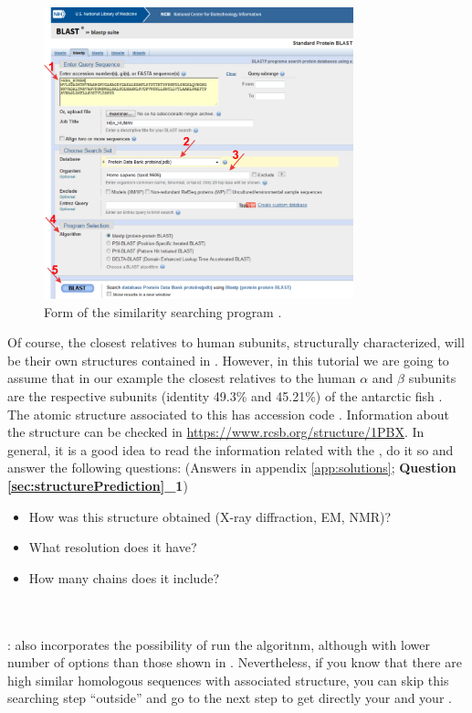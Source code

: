   \begin{figure}[H]
  \centering 
  \captionsetup{width=.7\linewidth} 
  \includegraphics[width=0.80\textwidth]{Images/Fig9}
  \caption{Form of the similarity searching program .}
  \label{fig:blastp}
  \end{figure}
  
  Of course, the closest relatives to human  subunits, structurally characterized, will be their own structures contained in . However, in this tutorial we are going to assume that in our example the closest relatives to the human  $\alpha$ and $\beta$ subunits are the respective  subunits (identity 49.3\% and 45.21\%) of the antarctic fish  \citep{camardella1992}. The atomic structure associated to this  has  accession code . Information about the structure can be checked in \url{https://www.rcsb.org/structure/1PBX}. In general, it is a good idea to read the information related with the , do it so and answer the following questions: (Answers in appendix \ref{app:solutions}; \textbf{Question \ref{sec:structurePrediction}\_1})
  
  \begin{minipage}{\linewidth}
    \begin{framed}
      \begin{itemize}
        \item How was this structure obtained (X-ray diffraction, EM, NMR)?
        \item What resolution does it have?
        \item How many chains does it include?
      \end{itemize}
    \end{framed}
  \end{minipage}
\\
\\
  
  : \chimera also incorporates the possibility of run the  algoritnm, although with lower number of options than those shown in . Nevertheless, if you know that there are high similar homologous sequences with associated structure, you can skip this searching step ``outside'' \scipion and go to the next step to get directly your   and your .  
